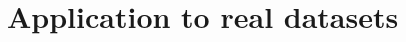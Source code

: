 \documentclass[12pt]{article}
\begin{document}
\section{Application to real datasets}
%
\end{document}
